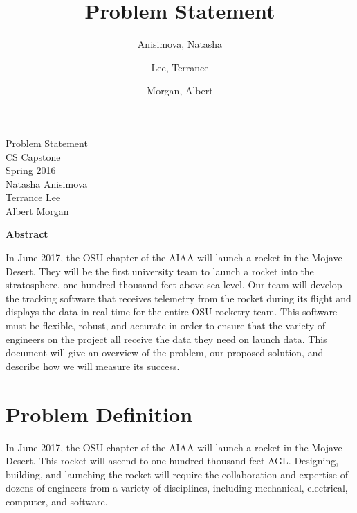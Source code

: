 \documentclass[10pt,journal,draftclsnofoot,onecolumn]{IEEEtran}
\begin{document}
	\singlespace
	
	\title{\vspace{2in}Problem Statement}
	
	\author {
		Anisimova, Natasha
		\and
		Lee, Terrance
		\and
		Morgan, Albert
	}
	
	
	\pagestyle{empty}
	\vspace*{2in}
	\begin{center}
		\huge
		Problem Statement\\
		\normalsize
		\vspace{5mm}
		CS Capstone\\
		Spring 2016\\
		\vspace{5mm}
		Natasha Anisimova\\
		Terrance Lee\\
		Albert Morgan
	\end{center}
	
	\vspace{5mm}
	
	\begin{center}
		\textbf{Abstract}
	\end{center}
	
	\begin{adjustwidth}{2in}{2in}
		In June 2017, the OSU chapter of the
		AIAA will launch a rocket in the Mojave Desert.
		They will be the first university team to launch a rocket into the stratosphere, one hundred thousand feet above 
		sea level.
		Our team will develop the tracking software that receives
		telemetry from the rocket during its flight
		and displays the data in real-time for the entire OSU rocketry team.
		This software must be flexible, robust, and accurate in order
		to ensure that the variety of engineers on the project all receive
		the data they need on launch data.
		This document will give an overview of the problem,
		our proposed solution,
		and describe how we will measure its success.
	\end{adjustwidth}
	
	\newpage
	\pagestyle{headings}
	\section{Problem Definition}
	In June 2017, the \ac{OSU} chapter of the
	\ac{AIAA} will launch a rocket in the Mojave Desert.
	This rocket will ascend to one hundred thousand feet \ac{AGL}.
	Designing, building, and launching the rocket will require the
	collaboration and expertise of dozens of engineers from a variety
	of disciplines, including mechanical, electrical, computer, and
	software.
	
\end{document}
